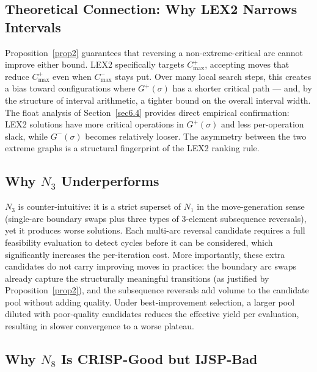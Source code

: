 \documentclass[preprint,12pt]{elsarticle}
\begin{document}
\subsection{Theoretical Connection: Why LEX2 Narrows Intervals}
\label{sec7.2}

Proposition~\ref{prop2} guarantees that reversing a non-extreme-critical arc cannot improve either bound. LEX2 specifically targets $C^+_{\max}$, accepting moves that reduce $C^+_{\max}$ even when $C^-_{\max}$ stays put. Over many local search steps, this creates a bias toward configurations where $G^+(\sigma)$ has a shorter critical path --- and, by the structure of interval arithmetic, a tighter bound on the overall interval width. The float analysis of Section~\ref{sec6.4} provides direct empirical confirmation: LEX2 solutions have more critical operations in $G^+(\sigma)$ and less per-operation slack, while $G^-(\sigma)$ becomes relatively looser. The asymmetry between the two extreme graphs is a structural fingerprint of the LEX2 ranking rule.

\subsection{Why $N_3$ Underperforms}
\label{sec7.3}

$N_3$ is counter-intuitive: it is a strict superset of $N_1$ in the move-generation sense (single-arc boundary swaps plus three types of 3-element subsequence reversals), yet it produces worse solutions. Each multi-arc reversal candidate requires a full feasibility evaluation to detect cycles before it can be considered, which significantly increases the per-iteration cost. More importantly, these extra candidates do not carry improving moves in practice: the boundary arc swaps already capture the structurally meaningful transitions (as justified by Proposition~\ref{prop2}), and the subsequence reversals add volume to the candidate pool without adding quality. Under best-improvement selection, a larger pool diluted with poor-quality candidates reduces the effective yield per evaluation, resulting in slower convergence to a worse plateau.

\subsection{Why $N_8$ Is CRISP-Good but IJSP-Bad}
\label{sec7.4}
\end{document}
